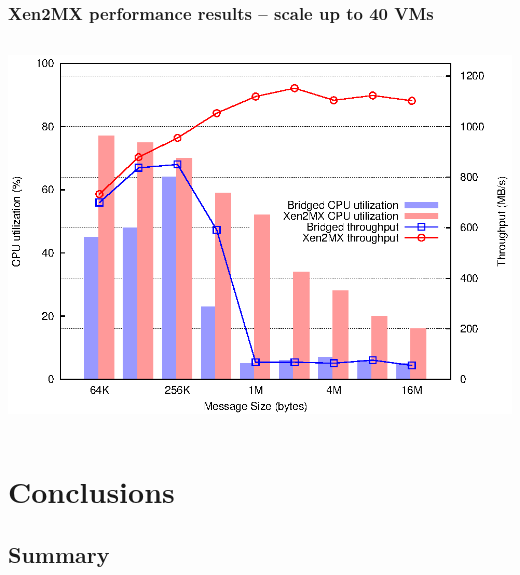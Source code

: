 \documentclass[red,slidestop,notes,compress,mathserif]{beamer}
\begin{document}
\begin{frame}
\frametitle{Xen2MX performance results -- scale up to 40 VMs}
\begin{columns}
\includegraphics[width=\textwidth]{figs/bare/scale_bw.eps}
\end{columns}
\end{frame}

\section{Conclusions}

\subsection{Summary}
\end{document}
